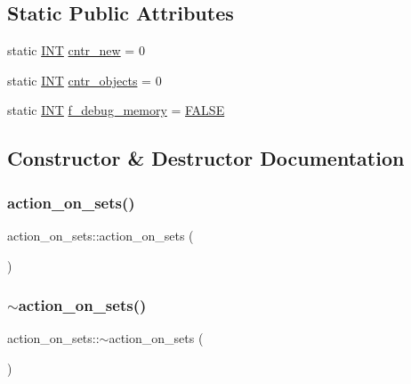\subsection*{Static Public Attributes}
\begin{DoxyCompactItemize}
\item 
static \mbox{\hyperlink{galois_8h_a09fddde158a3a20bd2dcadb609de11dc}{I\+NT}} \mbox{\hyperlink{classaction__on__sets_a5897e2dd28ffdf90e8e443cfecca3260}{cntr\+\_\+new}} = 0
\item 
static \mbox{\hyperlink{galois_8h_a09fddde158a3a20bd2dcadb609de11dc}{I\+NT}} \mbox{\hyperlink{classaction__on__sets_a1f2893547a9729e1e1186d75b3ae215a}{cntr\+\_\+objects}} = 0
\item 
static \mbox{\hyperlink{galois_8h_a09fddde158a3a20bd2dcadb609de11dc}{I\+NT}} \mbox{\hyperlink{classaction__on__sets_a4eb58e6f8087a5a94a9728371fee7ae7}{f\+\_\+debug\+\_\+memory}} = \mbox{\hyperlink{nauty_8h_aa93f0eb578d23995850d61f7d61c55c1}{F\+A\+L\+SE}}
\end{DoxyCompactItemize}


\subsection{Constructor \& Destructor Documentation}
\mbox{\label{classaction__on__sets_ad3bce26f258c0c11a287a4fb8c4999a1}} 
\subsubsection{\texorpdfstring{action\+\_\+on\+\_\+sets()}{action\_on\_sets()}}
{\footnotesize\ttfamily action\+\_\+on\+\_\+sets\+::action\+\_\+on\+\_\+sets (\begin{DoxyParamCaption}{ }\end{DoxyParamCaption})}

\mbox{\label{classaction__on__sets_adeff08f206ceeedd266e25eccfe9152c}} 
\subsubsection{\texorpdfstring{$\sim$action\+\_\+on\+\_\+sets()}{~action\_on\_sets()}}
{\footnotesize\ttfamily action\+\_\+on\+\_\+sets\+::$\sim$action\+\_\+on\+\_\+sets (\begin{DoxyParamCaption}{ }\end{DoxyParamCaption})}



